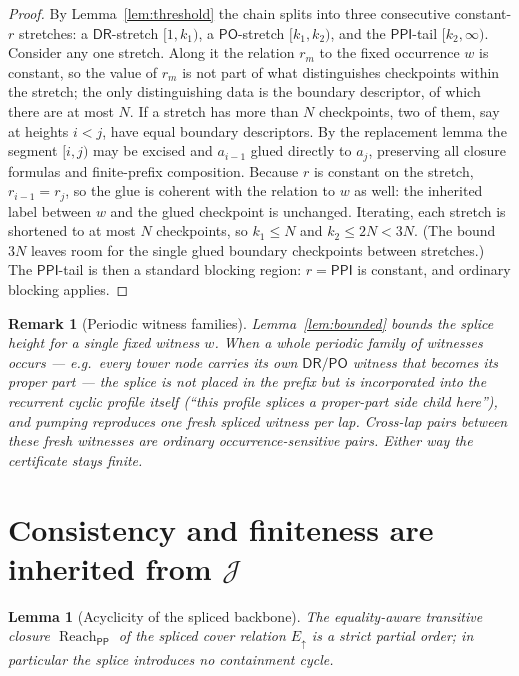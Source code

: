 \documentclass[11pt]{article}
\newtheorem{lemma}[theorem]{Lemma}
\newtheorem{remark}[theorem]{Remark}
\newcommand{\DR}{\mathsf{DR}}
\newcommand{\PO}{\mathsf{PO}}
\newcommand{\PP}{\mathsf{PP}}
\newcommand{\PPI}{\mathsf{PPI}}
\newcommand{\reach}{\operatorname{Reach}}
\newcommand{\Eup}{E_{\uparrow}}
\newcommand{\J}{\mathcal J}
\begin{document}
\begin{proof}
By Lemma~\ref{lem:threshold} the chain splits into three consecutive
constant-$r$ stretches: a $\DR$-stretch $[1,k_1)$, a $\PO$-stretch $[k_1,k_2)$,
and the $\PPI$-tail $[k_2,\infty)$.  Consider any one stretch.  Along it the
relation $r_m$ to the fixed occurrence $w$ is constant, so the value of $r_m$ is
not part of what distinguishes checkpoints within the stretch; the only
distinguishing data is the boundary descriptor, of which there are at most $N$.
If a stretch has more than $N$ checkpoints, two of them, say at heights $i<j$,
have equal boundary descriptors.  By the replacement lemma the segment
$[i,j)$ may be excised and $a_{i-1}$ glued directly to $a_j$, preserving all
closure formulas and finite-prefix composition.  Because $r$ is constant on the
stretch, $r_{i-1}=r_j$, so the glue is coherent with the relation to $w$ as
well: the inherited label between $w$ and the glued checkpoint is unchanged.
Iterating, each stretch is shortened to at most $N$ checkpoints, so
$k_1\le N$ and $k_2\le 2N<3N$.  (The bound $3N$ leaves room for the single
glued boundary checkpoints between stretches.)  The $\PPI$-tail is then a
standard blocking region: $r=\PPI$ is constant, and ordinary blocking applies.
\end{proof}

\begin{remark}[Periodic witness families]\label{rem:periodic}
Lemma~\ref{lem:bounded} bounds the splice height for a \emph{single} fixed
witness $w$.  When a whole \emph{periodic family} of witnesses occurs --- e.g.\
every tower node carries its own $\DR/\PO$ witness that becomes its proper part
--- the splice is not placed in the prefix but is incorporated into the
recurrent cyclic profile itself (``this profile splices a proper-part side child
here''), and pumping reproduces one fresh spliced witness per lap.  Cross-lap
pairs between these fresh witnesses are ordinary occurrence-sensitive pairs.
Either way the certificate stays finite.
\end{remark}

\section{Consistency and finiteness are inherited from \texorpdfstring{$\J$}{J}}

\begin{lemma}[Acyclicity of the spliced backbone]\label{lem:acyclic}
The equality-aware transitive closure $\reach_\PP$ of the spliced cover relation
$\Eup$ is a strict partial order; in particular the splice introduces no
containment cycle.
\end{lemma}
\end{document}
